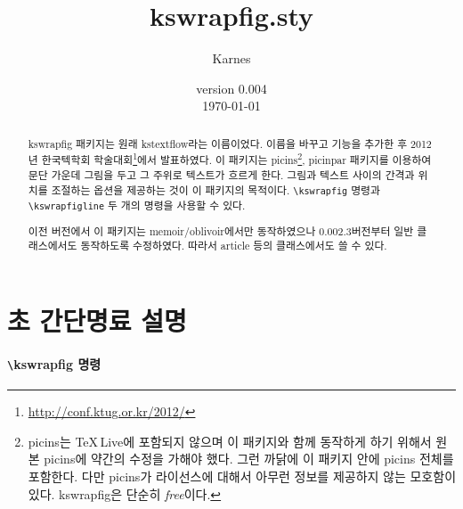 \documentclass[a4paper,nanum]{oblivoir}
\begin{document}
\title{kswrapfig.sty}
\author{Karnes}
\date{{\small version 0.004}\\ \today}

\maketitle

\begin{abstract}
kswrapfig 패키지는 원래 kstextflow라는 이름이었다. 이름을 바꾸고 기능을 추가한 후 2012년
한국텍학회 학술대회\footnote{\url{http://conf.ktug.or.kr/2012/}}에서 발표하였다.
이 패키지는 picins\footnote{picins는 \TeX\,Live에 포함되지 않으며 이 패키지와 함께 동작하게 하기 
위해서 원본 picins에 약간의 수정을 가해야 했다. 그런 까닭에 이 패키지 안에 picins 전체를 포함한다. 다만 picins가 라이선스에 대해서 아무런 정보를 제공하지 않는 모호함이 있다. kswrapfig은 단순히 \emph{free}이다.}, picinpar 패키지를 이용하여 문단 가운데 그림을 두고 그 주위로 텍스트가 흐르게 한다.
그림과 텍스트 사이의 간격과 위치를 조절하는 옵션을 제공하는 것이 이 패키지의 목적이다.
\verb|\kswrapfig| 명령과 \verb|\kswrapfigline| 두 개의 명령을 사용할 수 있다.

이전 버전에서 이 패키지는 memoir/oblivoir에서만 동작하였으나 0.002.3버전부터 일반 클래스에서도
동작하도록 수정하였다. 따라서 article 등의 클래스에서도 쓸 수 있다.
\end{abstract}

\renewcommand*\contentsname{}
\begin{mdframed}[skipabove=\onelineskip,frametitle=\textcolor{gray!90}{차\ \ \ \ 례},%
	frametitlealignment=\centering,
	frametitlebackgroundcolor=blue!15,
	frametitlebelowskip=5pt,
	frametitlerulecolor=gray,
	frametitlerulewidth=.4pt,
	frametitlerule=true,
	innertopmargin=-1.2\onelineskip,
	backgroundcolor=red!10,
	splittopskip=12pt,
	splitbottomskip=10pt,
	needspace=\onelineskip,
	outerlinewidth=1pt,
	outerlinecolor=gray!60,
	middlelinecolor=gray!60,
	innerlinecolor=gray!60,
]
\small
\tableofcontents*
\end{mdframed}

\clearpage

\section{초 간단명료 설명}

\paragraph{\texttt{\textbackslash}kswrapfig 명령}
\end{document}
